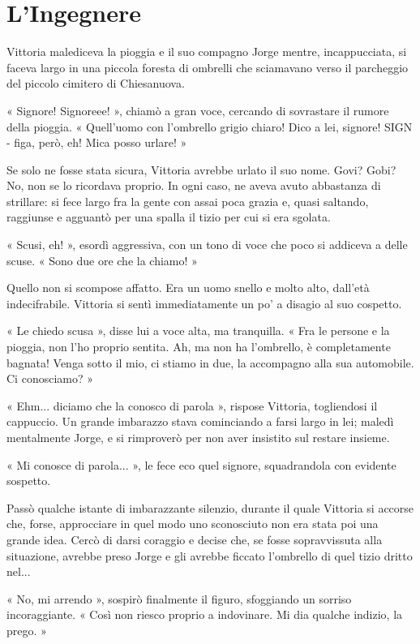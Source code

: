 \chapter{L'Ingegnere}


Vittoria malediceva la pioggia e il suo compagno Jorge mentre, incappucciata, si faceva largo in una piccola foresta di ombrelli che sciamavano verso il parcheggio del piccolo cimitero di Chiesanuova.

« Signore! Signoreee! », chiamò a gran voce, cercando di sovrastare il rumore della pioggia. « Quell'uomo con l'ombrello grigio chiaro! Dico a lei, signore! SIGN - figa, però, eh! Mica posso urlare! »

Se solo ne fosse stata sicura, Vittoria avrebbe urlato il suo nome. Govi? Gobi? No, non se lo ricordava proprio. In ogni caso, ne aveva avuto abbastanza di strillare: si fece largo fra la gente con assai poca grazia e, quasi saltando, raggiunse e agguantò per una spalla il tizio per cui si era sgolata.

« Scusi, eh! », esordì aggressiva, con un tono di voce che poco si addiceva a delle scuse. « Sono due ore che la chiamo! »

Quello non si scompose affatto. Era un uomo snello e molto alto, dall'età indecifrabile. Vittoria si sentì immediatamente un po' a disagio al suo cospetto.

« Le chiedo scusa », disse lui a voce alta, ma tranquilla. « Fra le persone e la pioggia, non l'ho proprio sentita. Ah, ma non ha l'ombrello, è completamente bagnata! Venga sotto il mio, ci stiamo in due, la accompagno alla sua automobile. Ci conosciamo? »

« Ehm... diciamo che la conosco di parola », rispose Vittoria, togliendosi il cappuccio. Un grande imbarazzo stava cominciando a farsi largo in lei; maledì mentalmente Jorge, e si rimproverò per non aver insistito sul restare insieme.

« Mi conosce di parola... », le fece eco quel signore, squadrandola con evidente sospetto.

Passò qualche istante di imbarazzante silenzio, durante il quale Vittoria si accorse che, forse, approcciare in quel modo uno sconosciuto non era stata poi una grande idea. Cercò di darsi coraggio e decise che, se fosse sopravvissuta alla situazione, avrebbe preso Jorge e gli avrebbe ficcato l'ombrello di quel tizio dritto nel...

« No, mi arrendo », sospirò finalmente il figuro, sfoggiando un sorriso incoraggiante. « Così non riesco proprio a indovinare. Mi dia qualche indizio, la prego. »

